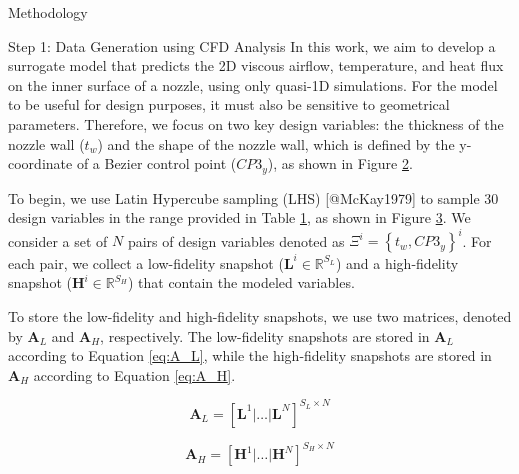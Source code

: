 \begin{frame}{Methodology}
\begin{block}{Step 1: Data Generation using CFD Analysis}
\protect\hypertarget{step-1-data-generation-using-cfd-analysis}{}
In this work, we aim to develop a surrogate model that predicts the 2D
viscous airflow, temperature, and heat flux on the inner surface of a
nozzle, using only quasi-1D simulations. For the model to be useful for
design purposes, it must also be sensitive to geometrical parameters.
Therefore, we focus on two key design variables: the thickness of the
nozzle wall (\(t_w\)) and the shape of the nozzle wall, which is defined
by the y-coordinate of a Bezier control point (\(CP3_y\)), as shown in
Figure \protect\hyperlink{fig:nozzle_shape}{2}.

To begin, we use Latin Hypercube sampling (LHS) {[}@McKay1979{]} to
sample 30 design variables in the range provided in Table
\protect\hyperlink{tab:lhs}{1}, as shown in Figure
\protect\hyperlink{fig:lhs}{3}. We consider a set of \(N\) pairs of
design variables denoted as \(\Xi^i=\left\{t_w, CP3_y\right\}^i\). For
each pair, we collect a low-fidelity snapshot
(\(\mathbf{L}^i \in \mathbb{R}^{S_L}\)) and a high-fidelity snapshot
(\(\mathbf{H}^i \in \mathbb{R}^{S_H}\)) that contain the modeled
variables.

To store the low-fidelity and high-fidelity snapshots, we use two
matrices, denoted by \(\mathbf{A}_L\) and \(\mathbf{A}_H\),
respectively. The low-fidelity snapshots are stored in \(\mathbf{A}_L\)
according to Equation \protect\hyperlink{eq:A_L}{{[}eq:A\_L{]}}, while
the high-fidelity snapshots are stored in \(\mathbf{A}_H\) according to
Equation \protect\hyperlink{eq:A_H}{{[}eq:A\_H{]}}.

\[\mathbf{A}_L = \left[ \mathbf{L}^1 | \dots | \mathbf{L}^N\right]^{S_L \times N}     
\label{eq:A_L}\]

\[\mathbf{A}_H = \left[ \mathbf{H}^1 | \dots | \mathbf{H}^N\right]^{S_H \times N}
\label{eq:A_H}\]


\end{block}
\end{frame}
